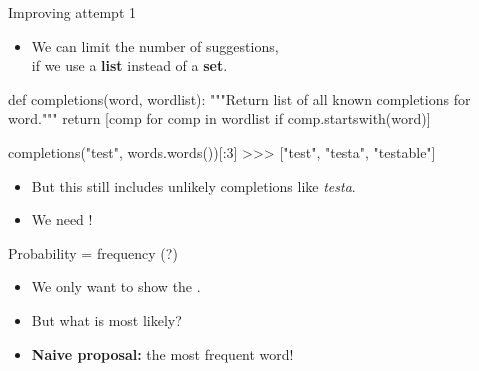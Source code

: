 \documentclass[professionalfonts, xcolor={usenames,svgnames,x11names,table}]{beamer}
\begin{document}
\begin{frame}[fragile]{Improving attempt 1}
    \begin{itemize}
        \item We can limit the number of suggestions,\\
              if we use a \textbf{list} instead of a \textbf{set}.
    \end{itemize}
    \begin{pythoncode}
        def completions(word, wordlist):
            """Return list of all known completions for word."""
            return [comp for comp in wordlist
                    if comp.startswith(word)]

        completions("test", words.words())[:3]
        >>> ["test", "testa", "testable"]
    \end{pythoncode}
    \begin{itemize}
        \item But this still includes unlikely completions like \emph{testa}.
        \item We need !
    \end{itemize}
\end{frame}

\begin{frame}{Probability = frequency (?)}
    \begin{itemize}
        \item We only want to show the .
        \item But what is most likely?
        \item \textbf{Naive proposal:} the most frequent word!
    \end{itemize}

\end{frame}
\end{document}
